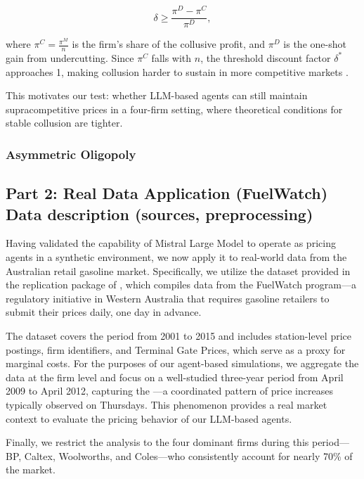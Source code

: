 $$
\delta \geq \frac{\pi^D - \pi^C}{\pi^D},
$$

where $\pi^C = \frac{\pi^M}{n}$ is the firm’s share of the collusive profit, and $\pi^D$ is the one-shot gain from undercutting. Since $\pi^C$ falls with $n$, the threshold discount factor $\delta^*$ approaches 1, making collusion harder to sustain in more competitive markets \parencite{tirole_theory_1988, ivaldi_chapter_2007}.

This motivates our test: whether LLM-based agents can still maintain supracompetitive prices in a four-firm setting, where theoretical conditions for stable collusion are tighter.


\subsubsection*{Asymmetric Oligopoly}






\subsection{Part 2: Real Data Application (FuelWatch)
Data description (sources, preprocessing)}

Having validated the capability of Mistral Large Model to operate as pricing agents in a synthetic environment, we now apply it to real-world data from the Australian retail gasoline market. Specifically, we utilize the dataset provided in the replication package of \textcite{byrne_learning_2019}, which compiles data from the FuelWatch program---a regulatory initiative in Western Australia that requires gasoline retailers to submit their prices daily, one day in advance.

The dataset covers the period from 2001 to 2015 and includes station-level price postings, firm identifiers, and Terminal Gate Prices, which serve as a proxy for marginal costs. For the purposes of our agent-based simulations, we aggregate the data at the firm level and focus on a well-studied three-year period from April 2009 to April 2012, capturing the —a coordinated pattern of price increases typically observed on Thursdays. This phenomenon provides a real market context to evaluate the pricing behavior of our LLM-based agents.

Finally, we restrict the analysis to the four dominant firms during this period—BP, Caltex, Woolworths, and Coles—who consistently account for nearly 70\% of the market.

